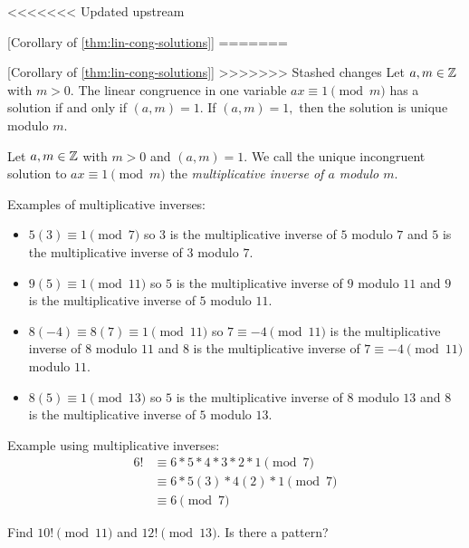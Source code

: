 \documentclass{ximera}
\begin{document}
<<<<<<< Updated upstream
\begin{corollary}\label{cor:condition-invertible}[Corollary of \autoref{thm:lin-cong-solutions}]
=======
\begin{corollary}\label{cor:condition-invertible}[Corollary of \cref{thm:lin-cong-solutions}]
>>>>>>> Stashed changes
    Let $a,m\in\mathbb Z$ with $m>0.$ The linear congruence in one variable $ax\equiv 1\pmod{m}$ has a solution if and only if $(a,m)=1$. If $(a,m)=1,$ then the solution is unique modulo $m$. 
\end{corollary}

\begin{defn}\label{defn:mult-inv} Let $a,m\in\mathbb Z$ with $m>0$ and $(a,m)=1.$
    We call the unique incongruent solution to $ax\equiv 1\pmod m$ the \emph{multiplicative inverse of $a$ modulo $m$}.
\end{defn}

\begin{example}\label{example:mult-inv}
    Examples of multiplicative inverses:
    \begin{itemize}
        \item $5(3)\equiv 1\pmod{7}$ so $3$ is the multiplicative inverse of $5$ modulo $7$ and $5$ is the multiplicative inverse of $3$ modulo $7$.
        \item $9(5)\equiv 1\pmod{11}$ so $5$ is the multiplicative inverse of $9$ modulo $11$ and $9$ is the multiplicative inverse of $5$ modulo $11$.
        \item $8(-4)\equiv 8(7)\equiv 1\pmod{11}$ so $7\equiv -4\pmod{11}$ is the multiplicative inverse of $8$ modulo $11$ and $8$ is the multiplicative inverse of $7\equiv -4\pmod{11}$ modulo $11$.
        \item $8(5)\equiv 1\pmod{13}$ so $5$ is the multiplicative inverse of $8$ modulo $13$ and $8$ is the multiplicative inverse of $5$ modulo $13$.
    \end{itemize}

    Example using multiplicative inverses:
    \begin{align*}
        6!& \equiv 6\ast 5\ast 4\ast 3\ast 2\ast 1\pmod{7}\\
          & \equiv 6\ast 5(3)\ast 4(2)\ast 1\pmod{7}\\
          & \equiv 6 \pmod{7}
    \end{align*}
\end{example}

\begin{tps}
    Find $10!\pmod{11}$ and $12!\pmod{13}.$ Is there a pattern?


\end{tps}
\end{corollary}
\end{document}
